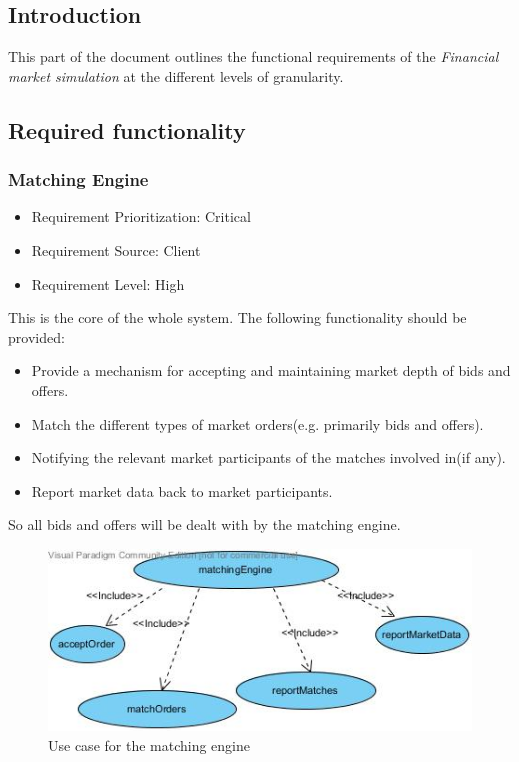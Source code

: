 \documentclass[12pt]{article}
\begin{document}
		\subsection{Introduction}	
		This part of the document outlines the functional requirements of the \textit{Financial market simulation} at the different levels of granularity. 
					    
		\subsection{Required functionality}	
				\subsubsection{Matching Engine}
				\begin{itemize}
					\item Requirement Prioritization: Critical
					\item Requirement Source: Client 	
					\item Requirement Level: High
				\end{itemize}
				This is the core of the whole system. The following functionality should be provided:
					\begin{itemize}
						\item Provide a mechanism for accepting and maintaining market depth of bids and offers.
						\item Match the different types of market orders(e.g. primarily bids and offers).
						\item Notifying the relevant market participants of the matches involved in(if any).
						\item Report market data back to market participants.
					\end{itemize}
				So all bids and offers will be dealt with by the matching engine.	
				
						\begin{figure}[th]
						\centering
						\includegraphics[scale=0.8]{./matching_engine_use_case}
						\caption{Use case for the matching engine}
						\label{matching engine use case}
						\end{figure}
				\pagebreak
\end{document}

